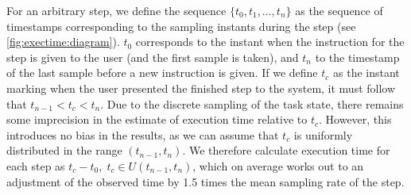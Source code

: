 For an arbitrary step, we define the sequence \( \{ t_{0}, t_{1}, \ldots, t_{n} \} \) as the sequence of timestamps corresponding to the sampling instants during the step (see \cref{fig:exectime:diagram}).
\( t_{0} \) corresponds to the instant when the instruction for the step is given to the user (and the first sample is taken), and \( t_{n} \) to the timestamp of the last sample before a new instruction is given.
If we define \( t_{c} \) as the instant marking when the user presented the finished step to the system, it must follow that \( t_{n-1} < t_{c} < t_{n} \).
Due to the discrete sampling of the task state, there remains some imprecision in the estimate of execution time relative to \( t_{c} \).
However, this introduces no bias in the results, as we can assume that \( t_{c} \) is uniformly distributed in the range \( (t_{n-1}, t_{n}) \).
We therefore calculate execution time for each step as \( t_{c} - t_{0},\; t_{c} \in U(t_{n-1}, t_{n}) \), which on average works out to an adjustment of the observed time by 1.5 times the mean sampling rate of the step.



